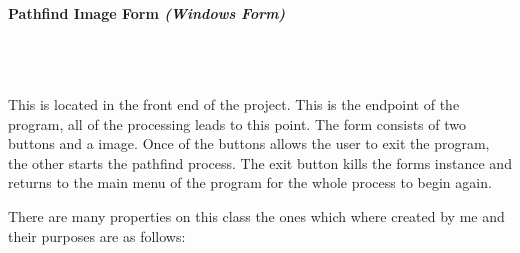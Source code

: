 \begin{FlushLeft}
    \pagebreak
\paragraph{Pathfind Image Form \textit{(Windows Form)}} \mbox{} \\

    \begin{figure}[H]
        \centering
    \end{figure}\\

    This is located in the front end of the project. This is the endpoint of the program, all of the processing leads to this point. The form consists of two buttons and a image. Once of the buttons allows the user to exit the program, the other starts the pathfind process. The exit button kills the forms instance and returns to the main menu of the program for the whole process to begin again. \\ \bk

    There are many properties on this class the ones which where created by me and their purposes are as follows:\\


\end{FlushLeft}
